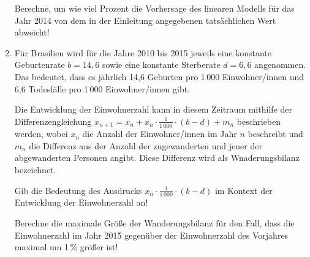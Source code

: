 \begin{langesbeispiel}
\begin{enumerate}
	Berechne, um wie viel Prozent die Vorhersage des linearen Modells für das Jahr 2014 von dem in der Einleitung angegebenen tatsächlichen Wert abweicht!\leer
	
	\item Für Brasilien wird für die Jahre 2010 bis 2015 jeweils eine konstante Geburtenrate $b=14,6$ sowie eine konstante Sterberate $d=6,6$ angenommen. Das bedeutet, dass es jährlich 14,6 Geburten pro 1\,000 Einwohner/innen und 6,6 Todesfälle pro 1\,000 Einwohner/innen gibt.
	
	Die Entwicklung der Einwohnerzahl kann in diesem Zeitraum mithilfe der Differenzengleichung $x_{n+1}=x_n+x_n\cdot\frac{1}{1\,000}\cdot(b-d)+m_n$ beschrieben werden, wobei $x_n$ die Anzahl der Einwohner/innen im Jahr $n$ beschreibt und $m_n$ die Differenz aus der Anzahl der zugewanderten und jener der abgewanderten Personen angibt. Diese Differenz wird als Wnaderungsbilanz bezeichnet.
	
	Gib die Bedeutung des Ausdrucks $x_n\cdot\frac{1}{1\,000}\cdot(b-d)$ im Kontext der Entwicklung der Einwohnerzahl an!
	
	Berechne die maximale Größe der Wanderungsbilanz für den Fall, dass die Einwohnerzahl im Jahr 2015 gegenüber der Einwohnerzahl des Vorjahres maximal um 1\,\% größer ist!
	
	\end{enumerate}

\end{langesbeispiel}
